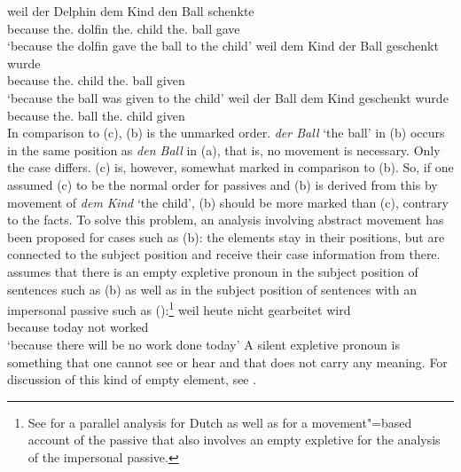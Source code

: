 \eal
\label{ex-passive-German-no-movement}
\ex 
\gll weil der Delphin dem Kind den Ball schenkte\\
     because the.\NOM{} dolfin the.\DAT{} child the.\ACC{} ball gave\\
\glt `because the dolfin gave the ball to the child'
\ex 
\gll weil    dem        Kind  der        Ball geschenkt wurde\\
     because the.\DAT{} child the.\NOM{} ball given \AUX\\
\glt `because the ball was given to the child'
\ex 
\gll weil    der        Ball dem        Kind  geschenkt wurde\\
     because the.\NOM{} ball the.\DAT{} child given     \AUX\\
\zl
In comparison to (c), (b) is the unmarked order. \emph{der Ball} `the ball' in (b) occurs
in the same position as \emph{den Ball} in (a), that is, no movement is necessary. Only the case differs.
(c) is, however, somewhat marked in comparison to (b). So, if one assumed (c) to
be the normal order for passives and (b) is derived from this by movement of \emph{dem
  Kind} `the child', (b) should be more marked than (c), contrary to the facts. To
solve this problem, an analysis involving abstract movement has been proposed for
cases such as (b): the elements stay in their positions, but are connected to
the subject position and receive their case information from there. \parencites[155--157]{Grewendorf88a}[]{Grewendorf93}
assumes that there is an empty expletive pronoun
in the subject position of sentences such as (b) as well as in the subject position of sentences with an
impersonal passive such as ():\footnote{%
	See  for a parallel analysis for Dutch as well as 
	 for a movement"=based account of the passive that also involves an
        empty expletive for the analysis of the impersonal passive.
}
\ea
\gll weil    heute nicht gearbeitet wird\\
     because today not   worked     \AUX\\
\glt `because there will be no work done today'
\z
A silent expletive pronoun is something that one cannot see or hear and that does not carry any meaning. For discussion of 
this kind of empty element, see \citep[]{MuellerGT-Eng4}.


